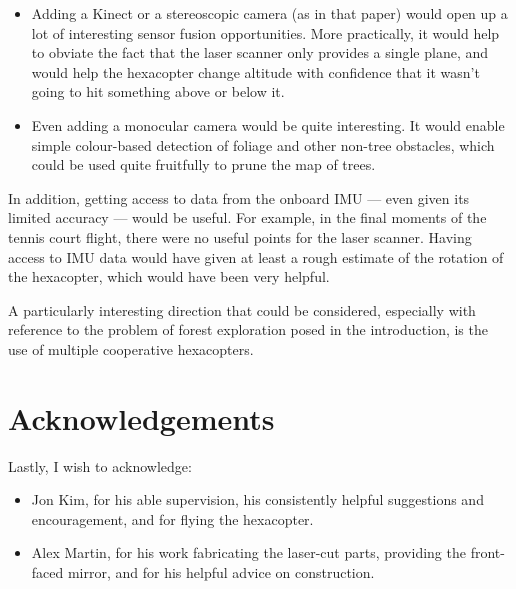 \documentclass[12pt,oneside,a4paper]{book}
\begin{document}
\begin{itemize}
\item Adding a Kinect or a stereoscopic
camera (as in that paper) would open up a lot of interesting sensor
fusion opportunities. More practically, it would help to obviate the
fact that the laser scanner only provides a single plane, and would
help the hexacopter change altitude with confidence that it wasn't
going to hit something above or below it.
\item Even adding a monocular camera would be quite interesting. It
  would enable simple colour-based detection of foliage and other
  non-tree obstacles, which could be used quite fruitfully to prune
  the map of trees.
\end{itemize}

In addition, getting access to data from the onboard IMU --- even
given its limited accuracy --- would be useful. For example, in the
final moments of the tennis court flight, there were no useful points
for the laser scanner. Having access to IMU data would have given at
least a rough estimate of the rotation of the hexacopter, which would
have been very helpful.

A particularly interesting direction that could be considered,
especially with reference to the problem of forest exploration posed
in the introduction, is the use of multiple cooperative
hexacopters.

\section{Acknowledgements}
\label{sec:acknowledgements}

Lastly, I wish to acknowledge:

\begin{itemize}
\item Jon Kim, for his able supervision, his consistently helpful
  suggestions and encouragement, and for flying the hexacopter.
\item Alex Martin, for his work fabricating the laser-cut parts,
  providing the front-faced mirror, and for his helpful advice on
  construction.
\end{itemize}


%

\backmatter
{}


\end{document}
